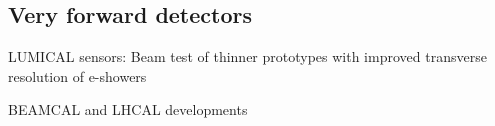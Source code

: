 \subsection{Very forward detectors}

LUMICAL sensors: Beam test of thinner prototypes with improved transverse resolution of e-showers

BEAMCAL and LHCAL developments

\vspace{4cm}